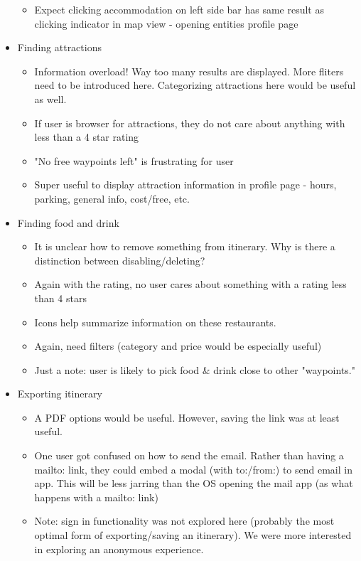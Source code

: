 \begin{itemize}
\begin{itemize}
  \item Expect clicking accommodation on left side bar has same result as clicking indicator in map view - opening entities profile page
  \end{itemize}
\item Finding attractions
  \begin{itemize}
  \item Information overload! Way too many results are displayed. More fliters need to be introduced here. Categorizing attractions here would be useful as well.
  \item If user is browser for attractions, they do not care about anything with less than a 4 star rating
  \item "No free waypoints left" is frustrating for user
  \item Super useful to display attraction information in profile page - hours, parking, general info, cost/free, etc.
  \end{itemize}
\item Finding food and drink
  \begin{itemize}
  \item It is unclear how to remove something from itinerary. Why is there a distinction between disabling/deleting?
  \item Again with the rating, no user cares about something with a rating less than 4 stars
  \item Icons help summarize information on these restaurants.
  \item Again, need filters (category and price would be especially useful)
  \item Just a note: user is likely to pick food & drink close to other "waypoints."
  \end{itemize}
\item Exporting itinerary
  \begin{itemize}
  \item A PDF options would be useful. However, saving the link was at least useful.
  \item One user got confused on how to send the email. Rather than having a mailto: link, they could embed a modal (with to:/from:) to send email in app. This will be less jarring than the OS opening the mail app (as what happens with a mailto: link)
  \item Note: sign in functionality was not explored here (probably the most optimal form of exporting/saving an itinerary). We were more interested in exploring an anonymous experience.
  \end{itemize}
\end{itemize}

